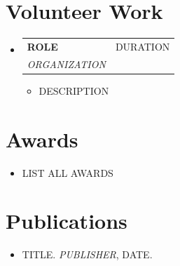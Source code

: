 \documentclass[letterpaper,10pt]{article}
\makeatletter
\newcommand{\resumeItem}[1]{\item\small{#1\vspace{-2pt}}}
\newcommand{\resumeSubheading}[4]{
  \vspace{-2pt}\item
  \begin{tabular*}{0.97\textwidth}[t]{l@{\extracolsep{\fill}}r}
    \textbf{#1} & #2 \\
    \textit{\small#3} & \textit{\small#4} \\
  \end{tabular*}\vspace{-7pt}
}
\newcommand{\resumeItemListStart}{\begin{itemize}[leftmargin=*]}
\newcommand{\resumeItemListEnd}{\end{itemize}\vspace{-5pt}}
\newcommand{\resumeSubHeadingListStart}{\begin{itemize}[leftmargin=0.15in,label={}]}
\newcommand{\resumeSubHeadingListEnd}{\end{itemize}}
\makeatother
\begin{document}
\section{Volunteer Work}
\resumeSubHeadingListStart
  \resumeSubheading{ROLE}{DURATION}{ORGANIZATION}{}
  \resumeItemListStart
    \resumeItem{DESCRIPTION}
  \resumeItemListEnd
\resumeSubHeadingListEnd

\section{Awards}
\begin{itemize}[leftmargin=0.15in,label={}]
  \small\item{LIST ALL AWARDS}
\end{itemize}

\section{Publications}
\begin{itemize}[leftmargin=0.15in,label={}]
  \small\item{TITLE. \textit{PUBLISHER}, DATE.}
\end{itemize}
\end{document}
